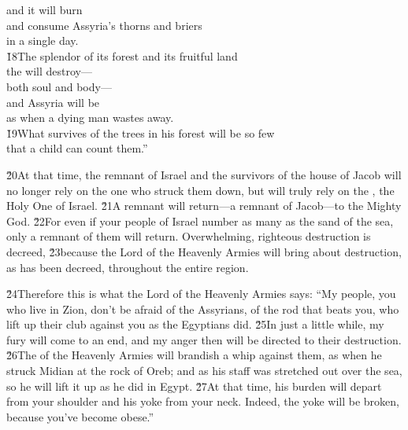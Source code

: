 \begin{poetry}
\poeml and it will burn \\
\poemll    and consume Assyria's thorns and briers \\
\poemlll       in a single day. \\
\poeml \v{18}The splendor of its forest and its fruitful land \\
\poemll    the  will destroy--- \\
\poemlll       both soul and body--- \\
\poeml and Assyria will be \\
\poemll    as when a dying man wastes away. \\
\poeml \v{19}What survives of the trees in his forest will be so few \\
\poemll    that a child can count them.''
\end{poetry}

\v{20}At that time, the remnant of Israel and the survivors of the house of Jacob will no longer rely on the one who struck them down, but will truly rely on the , the Holy One of Israel. \v{21}A remnant will return---a remnant of Jacob---to the Mighty God. \v{22}For even if your people of Israel number as many as the sand of the sea, only a remnant of them will return. Overwhelming, righteous destruction is decreed, \v{23}because the Lord  of the Heavenly Armies will bring about destruction, as has been decreed, throughout the entire region.

\v{24}Therefore this is what the Lord  of the Heavenly Armies says: ``My people, you who live in Zion, don't be afraid of the Assyrians, of the rod that beats you, who lift up their club against you as the Egyptians did. \v{25}In just a little while, my fury will come to an end, and my anger then will be directed to their destruction. \v{26}The  of the Heavenly Armies will brandish a whip against them, as when he struck Midian at the rock of Oreb; and as his staff was stretched out over the sea, so he will lift it up as he did in Egypt. \v{27}At that time, his burden will depart from your shoulder and his yoke from your neck. Indeed, the yoke will be broken, because you've become obese.''

